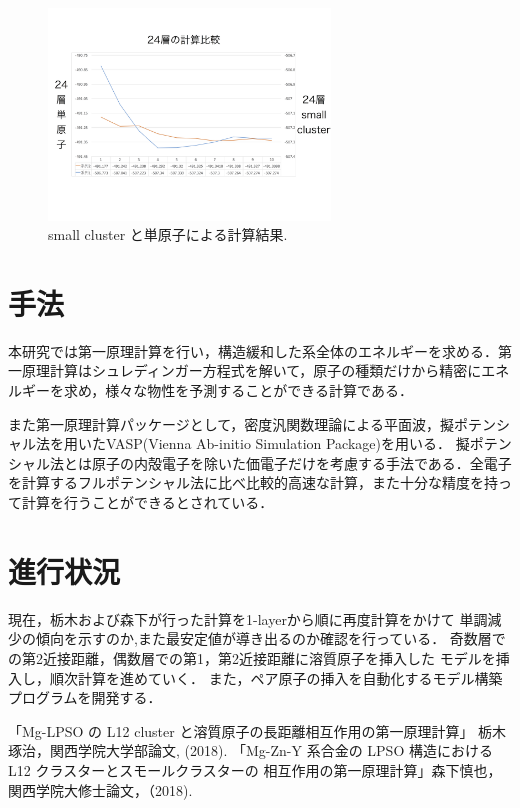 \documentclass[a4j,twocolumn]{jsarticle}
\begin{document}
\begin{figure}[h]
\vspace{0\baselineskip}
\begin{center}
   \includegraphics[width=75mm]{../png/24_small_single.png}
  \caption{small cluster と単原子による計算結果\cite{tochigi}. }
  \label{fig:24slab}
\end{center}
\end{figure}

\section{手法}

本研究では第一原理計算を行い，構造緩和した系全体のエネルギーを求める．第一原理計算はシュレディンガー方程式を解いて，原子の種類だけから精密にエネルギーを求め，様々な物性を予測することができる計算である．

また第一原理計算パッケージとして，密度汎関数理論による平面波，擬ポテンシャル法を用いたVASP(Vienna Ab-initio Simulation Package)を用いる．
擬ポテンシャル法とは原子の内殻電子を除いた価電子だけを考慮する手法である．全電子を計算するフルポテンシャル法に比べ比較的高速な計算，また十分な精度を持って計算を行うことができるとされている．

\section{進行状況}
現在，栃木および森下が行った計算を1-layerから順に再度計算をかけて
単調減少の傾向を示すのか,また最安定値が導き出るのか確認を行っている．
奇数層での第2近接距離，偶数層での第1，第2近接距離に溶質原子を挿入した
モデルを挿入し，順次計算を進めていく．
また，ペア原子の挿入を自動化するモデル構築プログラムを開発する．


\vspace{0.5\baselineskip}

{\small\setlength\baselineskip{10pt}	%
\begin{thebibliography}{9}
「Mg-LPSO の L12 cluster と溶質原子の長距離相互作用の第一原理計算」 栃木琢治，関西学院大学部論文, (2018).
 「Mg-Zn-Y 系合金の LPSO 構造における L12 クラスターとスモールクラスターの 相互作用の第一原理計算」森下慎也，関西学院大修士論文，（2018).

\end{thebibliography}
}
\end{document}

